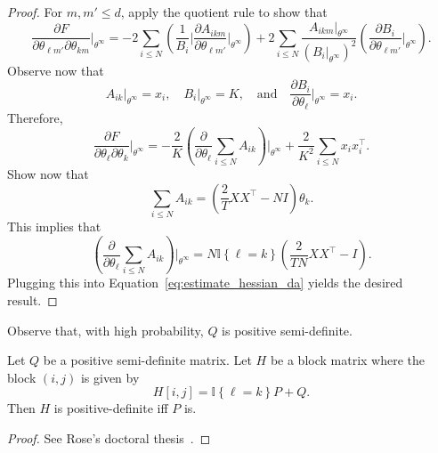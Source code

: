 \begin{proof}
For $m, m' \leq d$, apply the quotient rule to show that
%
\begin{equation}
\frac{\partial F}{\partial \theta_{\ell m'} \partial \theta_{k m}}\Bigr|_{\theta^\infty}
=
-2\sum_{i \leq N}\left(\frac{1}{B_i}\Bigr|\frac{\partial A_{ikm}}{\partial \theta_{\ell m'}}\Bigr|_{\theta^\infty}\right) + 2 \sum_{i \leq N} \frac{A_{ikm}\Bigr|_{\theta^\infty}}{\left(B_i \Bigr|_{\theta^\infty}\right)^2}\left(\frac{\partial B_i}{\partial \theta_{\ell m'}}\Bigr|_{\theta^\infty}\right).
\end{equation}
%
Observe now that
%
\begin{equation}
A_{ik}\Bigr|_{\theta^\infty} = x_i, \quad B_i \Bigr|_{\theta^\infty} = K, \quad \text{and} \quad \frac{\partial B_i}{\partial \theta_\ell}\Bigr|_{\theta^\infty} = x_i.
\end{equation}
%
Therefore,
%
\begin{equation}
\frac{\partial F}{\partial \theta_{\ell} \partial \theta_{k}}\Bigr|_{\theta^\infty}
= - \frac{2}{K}\left(\frac{\partial}{\partial \theta_\ell}\sum_{i \leq N}A_{ik}\right)\Bigr|_{\theta^\infty} + \frac{2}{K^2}\sum_{i \leq N}x_i x_i^\top.
\label{eq:estimate_hessian_da}
\end{equation}
%
Show now that
%
\begin{equation}
\sum_{i \leq N}A_{ik} = \left(\frac{2}{T}XX^\top - NI\right)\theta_k.
\end{equation}
%
This implies that
%
\begin{equation}
\left(\frac{\partial}{\partial \theta_\ell}\sum_{i \leq N}A_{ik}\right)\Bigr|_{\theta^\infty} = N\mathbb{I}\left\{\ell = k\right\}\left(\frac{2}{TN}XX^\top - I\right).
\end{equation}
%
Plugging this into Equation~\ref{eq:estimate_hessian_da} yields the desired result.
\end{proof}

Observe that, with high probability, $Q$ is positive semi-definite.

\begin{lemma}
Let $Q$ be a positive semi-definite matrix. Let $H$ be a block
matrix where the block $(i,j)$ is given by
%
\begin{equation}
H[i,j] = \mathbb{I}\left\{\ell = k\right\} P + Q.
\end{equation}
%
Then $H$ is positive-definite iff $P$ is.
\label{lem:aux_lemma_ross}
\end{lemma}

\begin{proof}
See Rose's doctoral thesis~\cite{rose1991deterministic}.
\end{proof}

